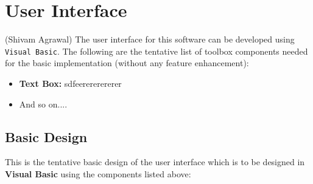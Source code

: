\documentclass[12pt,a4paper]{article}
\begin{document}
\section{User Interface}
(Shivam Agrawal)
	The user interface for this software can be developed using \texttt{Visual Basic}. The following are the tentative list of toolbox components needed for the basic implementation (without any feature enhancement):
    \begin{itemize}
        \item \textbf{Text Box:} sdfeerererererer
        \item And so on....
    \end{itemize}

    \subsection{Basic Design}
    This is the tentative basic design of the user interface which is to be designed in \textbf{Visual Basic} using the components listed above:
\end{document}
